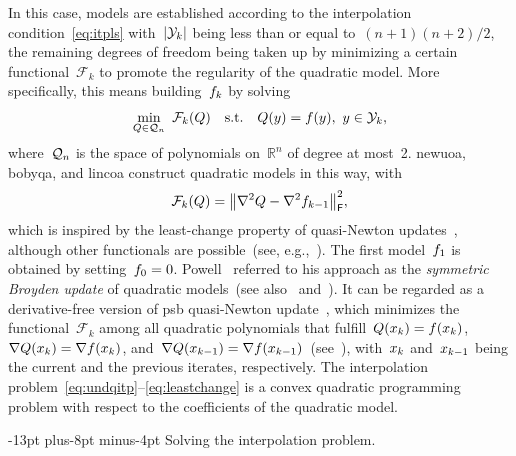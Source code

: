 \documentclass[smallextended]{svjour3}
\makeatletter
\newcommand{\abs}[2][]{#1\lvert#2#1\rvert}
\newcommand{\norm}[2][]{#1\lVert#2#1\rVert}
\newcommand{\R}{\mathbb{R}}
\newcommand{\st}{\text{s.t.}}
\newcommand{\frob}{\mathsf{F}}
\newcommand{\func}{\mathcal{F}}
\newcommand{\iter}[1][k]{x\ifthenelse{\equal{#1}{}}{}{_{#1}}}
\newcommand{\objm}[1][k]{\obj\ifthenelse{\equal{#1}{}}{}{_{#1}}}
\newcommand{\obj}{f}
\newcommand{\qspace}[1][n]{\mathcal{Q}\ifthenelse{\equal{#1}{}}{}{_{#1}}}
\newcommand{\xpt}[1][k]{\mathcal{Y}\ifthenelse{\equal{#1}{}}{}{_{#1}}}
\def\paragraph{\@startsection{paragraph}{4}{\z@}%
    {-13pt plus-8pt minus-4pt}{\z@}
    {\normalsize\bfseries}}
\newcommand{\modified}[1]{#1}
\makeatother
\begin{document}
In this case, models are established according to the interpolation condition~\eqref{eq:itpls} with~$\abs{\xpt}$ being less than \modified{or equal to}~$(n + 1)(n + 2) / 2$, the remaining degrees of freedom being taken up by minimizing a certain functional~$\func_k$ to promote the regularity of the quadratic model.
More specifically, this means building~$\objm$ by solving
\begin{equation}
    \label{eq:undqitp}
        \min_{Q \in \qspace} ~ \func_k(Q) \quad \st \quad Q(y) = \obj(y), ~ y \in \xpt,
\end{equation}
where~$\qspace$ is the space of polynomials on~$\R^n$ of degree at most~\num{2}.
\Gls{newuoa}, \gls{bobyqa}, and \gls{lincoa} construct quadratic models in this way, with
\begin{equation}
    \label{eq:leastchange}
    \func_k(Q) = \norm[\big]{\nabla^2 Q - \nabla^2 \objm[k - 1]}_{\frob}^2,
\end{equation}
which is inspired by the least-change property of quasi-Newton updates~\cite{Dennis_Schnabel_1979}, although other functionals are possible~(see\modified{, e.g.,}~\cite{Conn_Toint_1996,Bandeira_Scheinberg_Vicente_2012,Powell_2013,Zhang_2014,Xie_Yuan_2023}).
The first model~$\objm[1]$ is obtained by setting~$\objm[0] = 0$.
Powell~\cite{Powell_2013} referred to his approach as the \emph{symmetric Broyden update} of quadratic models~(see also~\cite[\S~3.6]{Zhang_2012} and~\cite[\S~2.4.2]{Ragonneau_2022}).
It can be regarded as a derivative-free version of \gls{psb} quasi-Newton update~\cite{Powell_1970b}, which minimizes the functional~$\func_k$ among all quadratic polynomials that fulfill~$Q(\iter) = \obj(\iter)$, $\nabla Q(\iter) = \nabla \obj(\iter)$, and~$\nabla Q(\iter[k - 1]) = \nabla \obj(\iter[k - 1])$~(see~\cite[Theorem~4.2]{Dennis_Schnabel_1979}), with~$\iter$ and~$\iter[k - 1]$ being the current and the previous iterates, respectively.
The interpolation problem~\eqref{eq:undqitp}--\eqref{eq:leastchange} is a convex quadratic programming problem with respect to the coefficients of the quadratic model.

\paragraph{Solving the interpolation problem.}
\end{document}

